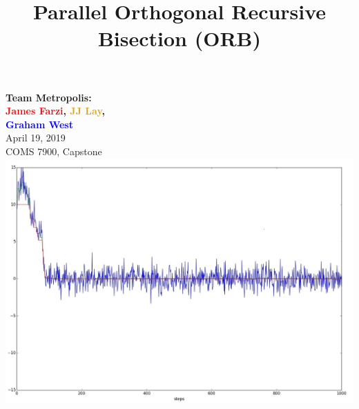 \documentclass[usernames,dvipsnames]{beamer}
\title[Capstone]{Parallel Orthogonal Recursive Bisection (ORB)}
\date{}
\begin{document}
\begin{frame}
	\titlepage
	
	\vspace{-65pt}
		
		\centering
		\textbf{Team Metropolis: \\
		\textcolor{red}{James Farzi}, \textcolor{Goldenrod}{JJ Lay}, \\ \textcolor{blue}{Graham West}} \\
		\vspace{7pt}
		April 19, 2019 \\
		\vspace{7pt}
		COMS 7900, Capstone \\
		\vspace{4pt}
		\includegraphics[scale = 0.17]{images/MCMC_Plot}
	\endminipage\hfill %
		\centering

\end{frame}
\end{document}
